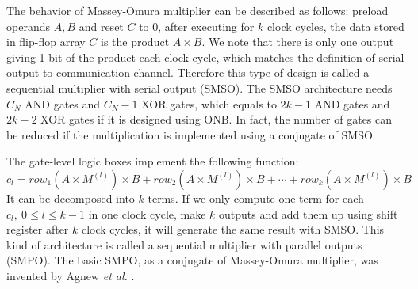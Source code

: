The behavior of Massey-Omura multiplier can be described as follows: preload operands $A,B$ and reset $C$ to 0, after 
executing for $k$ clock cycles, the data stored in flip-flop array $C$ is the product $A\times B$.
We note that there is only one output giving 1 bit of the product each clock cycle, which matches the 
definition of serial output to communication channel. Therefore this type of design is called a 
sequential multiplier with serial output (SMSO).
The SMSO architecture needs $C_N$ AND gates and $C_N-1$ XOR gates, which equals to $2k-1$ AND gates and $2k-2$ XOR gates
if it is designed using ONB. In fact, the number of gates can be reduced if the multiplication is 
implemented using a conjugate of SMSO.

\begin{figure}[bp]
\end{figure}

The gate-level logic boxes implement the following function:
\begin{equation}
\label{eqn:SMPOterms}
c_l = row_1(A\times M^{(l)}) \times B + row_2(A\times M^{(l)}) \times B + \cdots + row_{k}(A\times M^{(l)}) \times B
\end{equation}
It can be decomposed into $k$ terms. If we only compute one term for each $c_l,~0\leq l\leq k-1$ in one 
clock cycle, make $k$ outputs and add them up using shift register after $k$ clock cycles, 
it will generate the same result with SMSO. This kind of architecture is called a 
sequential multiplier with parallel outputs (SMPO). The basic SMPO, as a conjugate of Massey-Omura multiplier,
was invented by Agnew {\it et al.} \cite{agnew1991implementation}.

